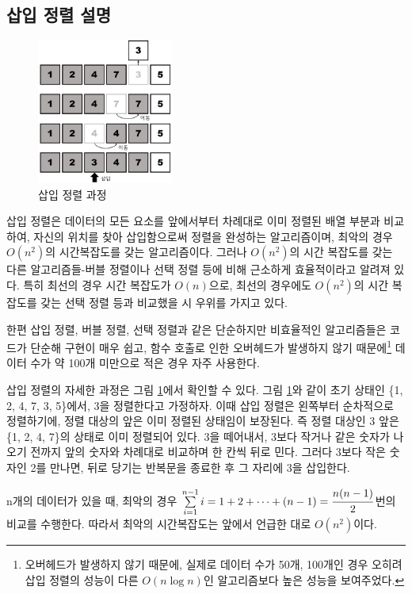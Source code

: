 \documentclass{article}
\begin{document}
\subsection{삽입 정렬 설명}
\begin{figure} [h]
    \centering
    \includegraphics[width=0.4\textwidth]{insertion_sort_process.jpg}
    \caption{삽입 정렬 과정}
    \label{fig:insetion sort process}
\end{figure}

삽입 정렬은 데이터의 모든 요소를 앞에서부터 차례대로 이미 정렬된 배열 부분과 비교하여, 자신의 위치를 찾아 삽입함으로써 정렬을 완성하는 알고리즘이며, 최악의 경우 $O(n^2)$의 시간복잡도를 갖는 알고리즘이다. 그러나 $O(n^2)$의 시간 복잡도를 갖는 다른 알고리즘들-버블 정렬이나 선택 정렬 등에 비해 근소하게 효율적이라고 알려져 있다. 특히 최선의 경우 시간 복잡도가 $O(n)$으로, 최선의 경우에도 $O(n^2)$의 시간 복잡도를 갖는 선택 정렬 등과 비교했을 시 우위를 가지고 있다.

한편 삽입 정렬, 버블 정렬, 선택 정렬과 같은 단순하지만 비효율적인 알고리즘들은 코드가 단순해 구현이 매우 쉽고, 함수 호출로 인한 오버헤드가 발생하지 않기 때문에\footnote{오버헤드가 발생하지 않기 때문에, 실제로 데이터 수가 50개, 100개인 경우 오히려 삽입 정렬의 성능이 다른 $O(n\log{n})$인 알고리즘보다 높은 성능을 보여주었다.} 데이터 수가 약 100개 미만으로 적은 경우 자주 사용한다.

삽입 정렬의 자세한 과정은 그림 \ref{fig:insetion sort process}에서 확인할 수 있다. 그림 \ref{fig:insetion sort process}와 같이 초기 상태인 \{1, 2, 4, 7, 3, 5\}에서, 3을 정렬한다고 가정하자. 이때 삽입 정렬은 왼쪽부터 순차적으로 정렬하기에, 정렬 대상의 앞은 이미 정렬된 상태임이 보장된다. 즉 정렬 대상인 3 앞은 \{1, 2, 4, 7\}의 상태로 이미 정렬되어 있다. 3을 떼어내서, 3보다 작거나 같은 숫자가 나오기 전까지 앞의 숫자와 차례대로 비교하며 한 칸씩 뒤로 민다. 그러다 3보다 작은 숫자인 2를 만나면, 뒤로 당기는 반복문을 종료한 후 그 자리에 3을 삽입한다.

n개의 데이터가 있을 때, 최악의 경우 $\sum\limits_{i=1}^{n-1}i=1+2+\cdots+(n-1)=\cfrac{n(n-1)}{2}$번의 비교를 수행한다. 따라서 최악의 시간복잡도는 앞에서 언급한 대로 $O(n^2)$이다.
\end{document}
